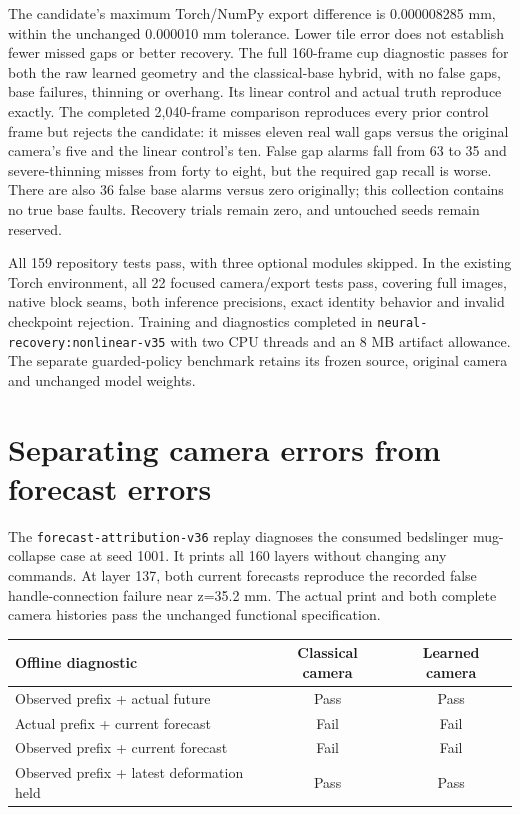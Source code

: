 \documentclass[10pt,letterpaper]{article}
\begin{document}
The candidate's maximum Torch/NumPy export difference is 0.000008285 mm, within
the unchanged 0.000010 mm tolerance. Lower tile error does not establish fewer
missed gaps or better recovery. The full 160-frame cup diagnostic passes for
both the raw learned geometry and the classical-base hybrid, with no false gaps,
base failures, thinning or overhang. Its linear control and actual truth reproduce
exactly. The completed 2,040-frame comparison reproduces every prior control
frame but rejects the candidate: it misses eleven real wall gaps versus the
original camera's five and the linear control's ten. False gap alarms fall from
63 to 35 and severe-thinning misses from forty to eight, but the required gap
recall is worse. There are also 36 false base alarms versus zero originally;
this collection contains no true base faults. Recovery trials remain zero,
and untouched seeds remain reserved.

All 159 repository tests pass, with three optional modules skipped. In the
existing Torch environment, all 22 focused camera/export tests pass, covering
full images, native block seams, both inference precisions, exact identity
behavior and invalid checkpoint rejection. Training and diagnostics completed in
\texttt{neural-recovery:nonlinear-v35} with two CPU threads and an 8 MB artifact
allowance. The separate guarded-policy benchmark retains its frozen source,
original camera and unchanged model weights.

\clearpage
\section{Separating camera errors from forecast errors}

The \texttt{forecast-attribution-v36} replay diagnoses the consumed bedslinger
mug-collapse case at seed 1001. It prints all 160 layers without changing any
commands. At layer 137, both current forecasts reproduce the recorded false
handle-connection failure near z=35.2 mm. The actual print and both complete
camera histories pass the unchanged functional specification.

\begin{center}
\begin{tabular}{@{}lcc@{}}
\toprule
Offline diagnostic & Classical camera & Learned camera \\
\midrule
Observed prefix + actual future & Pass & Pass \\
Actual prefix + current forecast & Fail & Fail \\
Observed prefix + current forecast & Fail & Fail \\
Observed prefix + latest deformation held & Pass & Pass \\
\bottomrule
\end{tabular}
\end{center}
\end{document}
